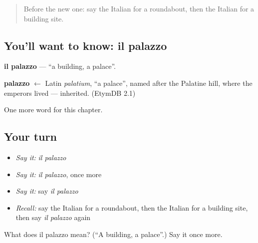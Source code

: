 \label{lesson:IT-C199-palazzo}



\begin{quote}
Before the new one: say the Italian for a roundabout, then the Italian for a building site.
\end{quote}

\subsection*{You'll want to know: il palazzo}
\textbf{il palazzo} — \textquotedblleft{}a building, a palace\textquotedblright{}.

\begin{cousinweb}
\textbf{palazzo} $\leftarrow$ Latin \emph{palatium}, \textquotedblleft{}a palace\textquotedblright{}, named after the Palatine hill, where the emperors lived — inherited. (EtymDB 2.1)
\end{cousinweb}

\begin{grammarlens}[title={What you've built}]
One more word for this chapter.
\end{grammarlens}

\subsection*{Your turn}
\begin{itemize}
\raggedright
  \item \emph{Say it:} \emph{il palazzo}
  \item \emph{Say it:} \emph{il palazzo}, once more
  \item \emph{Say it:} say \emph{il palazzo}
  \item \emph{Recall:} say the Italian for a roundabout, then the Italian for a building site, then say \emph{il palazzo} again
\end{itemize}

\begin{tcolorbox}[breakable,colback=teal!4,colframe=teal!35!black,title={Before you move on}]
What does il palazzo mean? (\textquotedblleft{}A building, a palace\textquotedblright{}.) Say it once more.
\end{tcolorbox}
